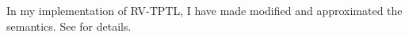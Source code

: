 \documentclass[a4paper]{article}
\newcommand{\tand}{\text{ and }}
\newcommand{\tor}{\text{ or }}
\newcommand{\tiff}{\text{ iff }}
\newcommand{\sn}{\bigcirc^+}
\newcommand{\wn}{\bigcirc^-}
\begin{document}
In my implementation of RV-TPTL, I have made modified and approximated the semantics. See  for details.





\end{document}
